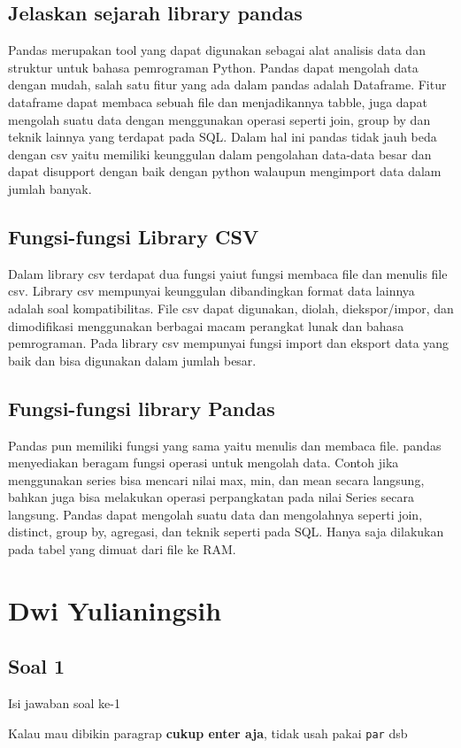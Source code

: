 \subsection{Jelaskan sejarah library pandas}
Pandas merupakan tool yang dapat digunakan sebagai alat analisis data dan struktur untuk bahasa pemrograman Python. Pandas dapat mengolah data dengan mudah, salah satu fitur yang ada dalam pandas adalah Dataframe. Fitur dataframe dapat membaca sebuah file dan menjadikannya tabble, juga dapat mengolah suatu data dengan menggunakan operasi seperti join, group by dan teknik lainnya yang terdapat pada SQL. Dalam hal ini pandas tidak jauh beda dengan csv yaitu memiliki keunggulan dalam pengolahan data-data besar dan dapat disupport dengan baik dengan python walaupun mengimport data dalam jumlah banyak.
\subsection{Fungsi-fungsi Library CSV}
Dalam library csv terdapat dua fungsi yaiut fungsi membaca file dan menulis file csv.
Library csv mempunyai keunggulan dibandingkan format data lainnya adalah soal kompatibilitas. File csv dapat digunakan, diolah, diekspor/impor, dan dimodifikasi menggunakan berbagai macam perangkat lunak dan bahasa pemrograman. Pada library csv mempunyai fungsi import dan eksport data yang baik dan bisa digunakan dalam jumlah besar.
\subsection{Fungsi-fungsi library Pandas}
Pandas pun memiliki fungsi yang sama yaitu menulis dan membaca file. pandas menyediakan beragam fungsi operasi untuk mengolah data. Contoh jika menggunakan series bisa mencari nilai max, min, dan mean secara langsung, bahkan juga bisa melakukan operasi perpangkatan pada nilai Series secara langsung.
Pandas dapat mengolah suatu data dan mengolahnya seperti join, distinct, group by, agregasi, dan teknik seperti pada SQL. Hanya saja dilakukan pada tabel yang dimuat dari file ke RAM.

\section{Dwi Yulianingsih}
\subsection{Soal 1}
Isi jawaban soal ke-1

Kalau mau dibikin paragrap \textbf{cukup enter aja}, tidak usah pakai \verb|par| dsb

